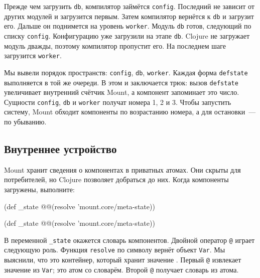 \fi

Прежде чем загрузить \verb|db|, компилятор займётся \verb|config|. Последний
не зависит от других модулей и загрузится первым. Затем компилятор вернётся к
\verb|db| и загрузит его. Дальше он поднимется на уровень
\verb|worker|. Модуль \verb|db| готов, следующий по списку
\verb|config|. Конфигурацию уже загрузили на этапе \verb|db|. Clojure не
загружает модуль дважды, поэтому компилятор пропустит его. На последнем шаге
загрузится \verb|worker|.


Мы вывели порядок пространств: \verb|config|, \verb|db|, \verb|worker|. Каждая
форма \verb|defstate| выполняется в той же очереди. В этом и заключается трюк:
вызов \verb|defstate| увеличивает внутренний счётчик Mount, а компонент
запоминает это число. Сущности \verb|config|, \verb|db| и \verb|worker| получат
номера 1, 2 и 3. Чтобы запустить систему, Mount обходит компоненты по
возрастанию номера, а для остановки~--- по убыванию.

\subsection{Внутреннее устройство}

Mount хранит сведения о компонентах в приватных атомах. Они скрыты для
потребителей, но Clojure позволяет добраться до них. Когда компоненты загружены,
выполните:

\ifx\DEVICETYPE\MOBILE

\begin{english}
  \begin{clojure}
(def _state
  @@(resolve 'mount.core/meta-state))
  \end{clojure}
\end{english}

\else

\begin{english}
  \begin{clojure}
(def _state @@(resolve 'mount.core/meta-state))
  \end{clojure}
\end{english}

\fi


В переменной \verb|_state| окажется словарь компонентов. Двойной оператор
\verb|@| играет следующую роль. Функция \verb|resolve| по символу вернёт
объект \verb|Var|. Мы выяснили, что это контейнер, который хранит
значение . Первый \verb|@| извлекает значение из
\verb|Var|; это атом со словарём. Второй \verb|@| получает словарь из атома.

